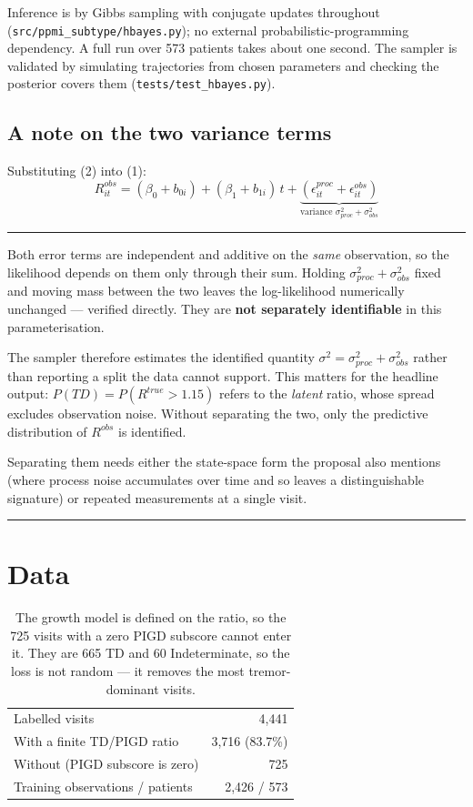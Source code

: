 \documentclass[11pt,a4paper]{article}
\newcommand{\code}[1]{\texttt{\small #1}}
\newenvironment{keypoint}
  {\begin{center}\begin{minipage}{0.94\textwidth}%
   \vspace{4pt}\hrule\vspace{7pt}\small}
  {\vspace{7pt}\hrule\vspace{4pt}\end{minipage}\end{center}}
\begin{document}
Inference is by Gibbs sampling with conjugate updates throughout
(\code{src/ppmi\_subtype/hbayes.py}); no external probabilistic-programming
dependency. A full run over 573 patients takes about one second. The sampler is
validated by simulating trajectories from chosen parameters and checking the
posterior covers them (\code{tests/test\_hbayes.py}).

\subsection{A note on the two variance terms}

Substituting (2) into (1):
\[
  R^{obs}_{it} = (\beta_0 + b_{0i}) + (\beta_1 + b_{1i})\, t
    + \underbrace{(\epsilon^{proc}_{it} + \epsilon^{obs}_{it})}_{\text{variance } \sigma^2_{proc} + \sigma^2_{obs}}
\]

\begin{keypoint}
Both error terms are independent and additive on the \emph{same} observation,
so the likelihood depends on them only through their sum. Holding
$\sigma^2_{proc} + \sigma^2_{obs}$ fixed and moving mass between the two leaves
the log-likelihood numerically unchanged --- verified directly. They are
\textbf{not separately identifiable} in this parameterisation.

The sampler therefore estimates the identified quantity
$\sigma^2 = \sigma^2_{proc} + \sigma^2_{obs}$ rather than reporting a split the
data cannot support. This matters for the headline output: $P(TD) = P(R^{true}
> 1.15)$ refers to the \emph{latent} ratio, whose spread excludes observation
noise. Without separating the two, only the predictive distribution of
$R^{obs}$ is identified.

Separating them needs either the state-space form the proposal also mentions
(where process noise accumulates over time and so leaves a distinguishable
signature) or repeated measurements at a single visit.
\end{keypoint}

\section{Data}

\begin{table}[H]
\centering
\begin{tabular}{@{}lr@{}}
\toprule
Labelled visits                          & 4{,}441 \\
With a finite TD/PIGD ratio              & 3{,}716 \quad (83.7\%) \\
Without (PIGD subscore is zero)          & \phantom{0,}725 \\
\midrule
Training observations / patients         & 2{,}426 / 573 \\
\bottomrule
\end{tabular}
\caption{The growth model is defined on the ratio, so the 725 visits with a
zero PIGD subscore cannot enter it. They are 665 TD and 60 Indeterminate, so
the loss is not random --- it removes the most tremor-dominant visits.}
\end{table}
\end{document}
